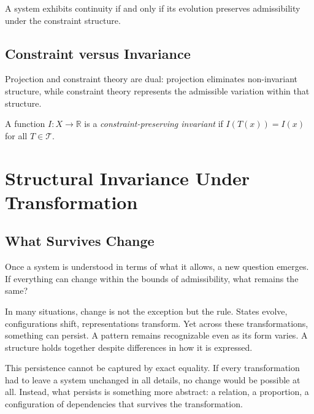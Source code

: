 \documentclass[11pt,openany]{book}
\begin{document}
\begin{proposition}
\label{prop:continuity}
A system exhibits continuity if and only if its evolution
preserves admissibility under the constraint structure.
\end{proposition}

\section{Constraint versus Invariance}
\label{sec:constraint-vs-invariance}

\begin{proposition}[Duality]
Projection and constraint theory are dual: projection
eliminates non-invariant structure, while constraint theory
represents the admissible variation within that structure.
\end{proposition}

\begin{definition}
A function $I : X \to \mathbb{R}$ is a
\emph{constraint-preserving invariant} if $I(T(x)) = I(x)$
for all $T \in \mathcal{T}$.
\end{definition}


\chapter{Structural Invariance Under Transformation}
\label{ch:structural-invariance}

\section*{ What Survives Change}

Once a system is understood in terms of what it allows, a new question emerges. If everything can change within the bounds of admissibility, what remains the same?

In many situations, change is not the exception but the rule. States evolve, configurations shift, representations transform. Yet across these transformations, something can persist. A pattern remains recognizable even as its form varies. A structure holds together despite differences in how it is expressed.

This persistence cannot be captured by exact equality. If every transformation had to leave a system unchanged in all details, no change would be possible at all. Instead, what persists is something more abstract: a relation, a proportion, a configuration of dependencies that survives the transformation.
\end{document}
